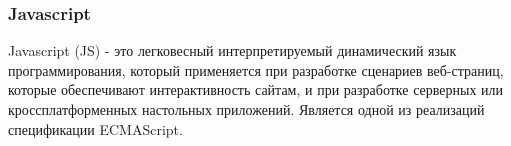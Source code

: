 \subsubsection{Javascript}

Javascript (JS) - это легковесный интерпретируемый динамический язык программирования, который применяется при разработке сценариев веб-страниц, которые обеспечивают интерактивность сайтам, и при разработке серверных или кроссплатформенных настольных приложений. Является одной из реализаций спецификации ECMAScript.

